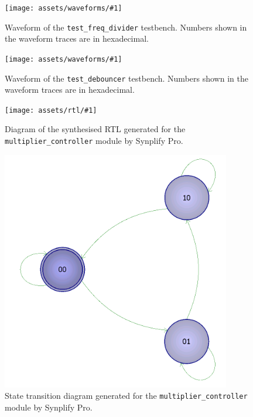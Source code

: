 \documentclass[a4paper]{article}
\newcommand{\waveformfigure}[2]{
  \begin{figure}[tbp]
    \centering\texttt{[image: assets/waveforms/\#1]}
    \caption{#2}
    \label{fig:wave:#1}
  \end{figure}
}
\newcommand{\rtlfigure}[2]{
  \begin{figure}[tbp]
    \centering\texttt{[image: assets/rtl/\#1]}
    \caption{#2}
    \label{fig:rtl:#1}
  \end{figure}
}
\begin{document}
\waveformfigure{test_freq_divider}{Waveform of the \texttt{test\_freq\_divider} testbench. Numbers shown in the waveform traces are in hexadecimal.}

\waveformfigure{test_debouncer}{Waveform of the \texttt{test\_debouncer} testbench. Numbers shown in the waveform traces are in hexadecimal.}

\rtlfigure{multiplier_controller}{Diagram of the synthesised RTL generated for the \texttt{multiplier\_controller} module by Synplify Pro.}

\begin{figure}[tbp]
  \centering\includegraphics[width=10cm]{assets/rtl/fsm}
  \caption{State transition diagram generated for the \texttt{multiplier\_controller} module by Synplify Pro.}
  \label{fig:fsm}
\end{figure}

\end{document}
